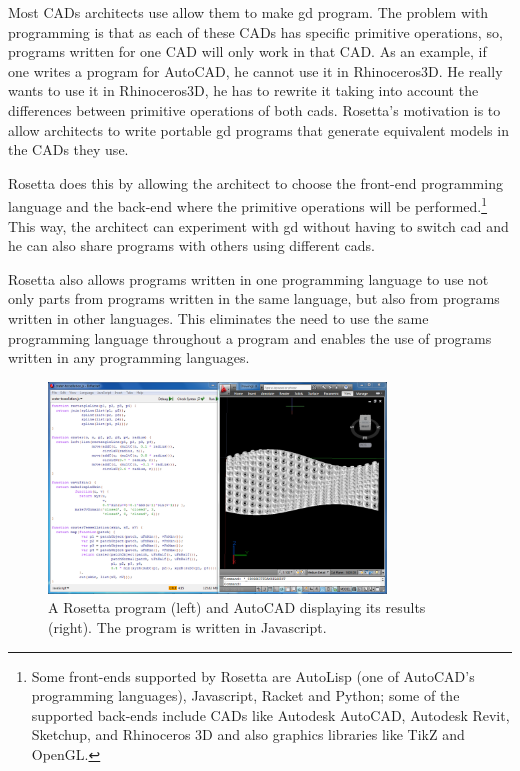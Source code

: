 \documentclass{./llncs2e/llncs}
\begin{document}
	Most CADs architects use allow them to make \ac{gd} program.
	The problem with programming is that as each of these CADs has specific primitive operations, so, programs written for one CAD will only work in that CAD.
	As an example, if one writes a program for AutoCAD, he cannot use it in Rhinoceros3D.
	He really wants to use it in Rhinoceros3D, he has to rewrite it taking into account the differences between primitive operations of both \acp{cad}.
	Rosetta's motivation is to allow architects to write portable \ac{gd} programs that generate equivalent models in the CADs they use.
	
	Rosetta does this by allowing the architect to choose the front-end programming language and the back-end where the primitive operations will be performed.\footnote{Some front-ends supported by Rosetta are AutoLisp (one of AutoCAD's programming languages), Javascript, Racket and Python; some of the supported back-ends include CADs like Autodesk AutoCAD, Autodesk Revit, Sketchup, and Rhinoceros 3D and also graphics libraries like TikZ and OpenGL.}
	This way, the architect can experiment with \ac{gd} without having to switch \ac{cad} and he can also share programs with others using different \acp{cad}.

	Rosetta also allows programs written in one programming language to use not only parts from programs written in the same language, but also from programs written in other languages.
	This eliminates the need to use the same programming language throughout a program and enables the use of programs written in any programming languages.
	
	\begin{figure}
		\centering
		\includegraphics[width=0.8\textwidth]{img/rosetta_js_autocad}
		\caption{A Rosetta program (left) and AutoCAD displaying its results (right). The program is written in Javascript.}
		\label{fig:rosetta:ex}
	\end{figure} 
\end{document}
